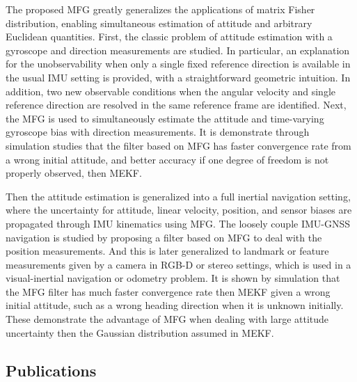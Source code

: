 The proposed MFG greatly generalizes the applications of matrix Fisher distribution, enabling simultaneous estimation of attitude and arbitrary Euclidean quantities.
First, the classic problem of attitude estimation with a gyroscope and direction measurements are studied.
In particular, an explanation for the unobservability when only a single fixed reference direction is available in the usual IMU setting is provided, with a straightforward geometric intuition.
In addition, two new observable conditions when the angular velocity and single reference direction are resolved in the same reference frame are identified.
Next, the MFG is used to simultaneously estimate the attitude and time-varying gyroscope bias with direction measurements.
It is demonstrate through simulation studies that the filter based on MFG has faster convergence rate from a wrong initial attitude, and better accuracy if one degree of freedom is not properly observed, then MEKF.

Then the attitude estimation is generalized into a full inertial navigation setting, where the uncertainty for attitude, linear velocity, position, and sensor biases are propagated through IMU kinematics using MFG.
The loosely couple IMU-GNSS navigation is studied by proposing a filter based on MFG to deal with the position measurements.
And this is later generalized to landmark or feature measurements given by a camera in RGB-D or stereo settings, which is used in a visual-inertial navigation or odometry problem.
It is shown by simulation that the MFG filter has much faster convergence rate then MEKF given a wrong initial attitude, such as a wrong heading direction when it is unknown initially.
These demonstrate the advantage of MFG when dealing with large attitude uncertainty then the Gaussian distribution assumed in MEKF.

\subsection{Publications}

